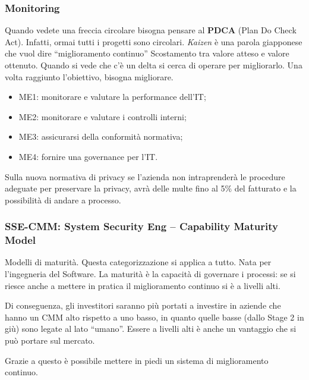 \subsubsection{Monitoring} 
Quando vedete una freccia circolare bisogna pensare al \textbf{PDCA} (Plan Do 
Check Act). Infatti, ormai tutti i progetti sono circolari.  
\emph{Kaizen} è una parola giapponese che vuol dire ``miglioramento continuo''
Scostamento tra valore atteso e valore ottenuto. Quando si vede che c'è un 
delta si cerca di operare per migliorarlo.
Una volta raggiunto l'obiettivo, bisogna migliorare.

\begin{itemize}
\item ME1: monitorare e valutare la performance dell'IT;
\item ME2: monitorare e valutare i controlli interni;
\item ME3: assicurarsi della conformità normativa;
\item ME4: fornire una governance per l'IT.
\end{itemize}

Sulla nuova normativa di privacy se l'azienda non intraprenderà le procedure 
adeguate per preservare la privacy, avrà delle multe fino al 5\% del fatturato 
e la possibilità di andare a processo.

\subsubsection{SSE-CMM: System Security Eng -- Capability Maturity Model}

Modelli di maturità. Questa categorizzazione si applica a tutto. Nata per 
l'ingegneria del Software.
La maturità è la capacità di governare i processi: se si riesce anche a 
mettere in pratica il miglioramento continuo si è a livelli alti.

Di conseguenza, gli investitori saranno più portati a investire in aziende che 
hanno un CMM alto rispetto a uno basso, in quanto quelle basse (dallo Stage 2 
in giù) sono legate al lato ``umano''. Essere a livelli alti è anche un 
vantaggio che si può portare sul mercato.

Grazie a questo è possibile mettere in piedi un sistema di miglioramento 
continuo.

